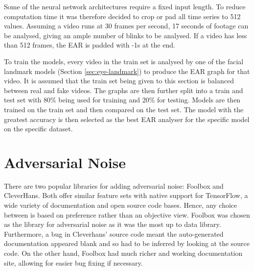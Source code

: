 Some of the neural network architectures require a fixed input length. To reduce computation time it was therefore decided to crop or pad all time series to 512 values. Assuming a video runs at 30 frames per second, 17 seconds of footage can be analysed, giving an ample number of blinks to be analysed. If a video has less than 512 frames, the EAR is padded with -1s at the end.

To train the models, every video in the train set is analysed by one of the facial landmark models (Section \ref{sec:eye-landmark}) to produce the EAR graph for that video. It is assumed that the train set being given to this section is balanced between real and fake videos. The graphs are then further split into a train and test set with 80\% being used for training and 20\% for testing. Models are then trained on the train set and then compared on the test set. The model with the greatest accuracy is then selected as the best EAR analyser for the specific model on the specific dataset.

\section{Adversarial Noise}
\label{sec:ad-noise}


There are two popular libraries for adding adversarial noise: Foolbox\cite{rauber2017foolbox}\cite{rauber2017foolboxnative} and CleverHans\cite{papernot2018cleverhans}. Both offer similar feature sets with native support for TensorFlow, a wide variety of documentation and open source code bases. Hence, any choice between is based on preference rather than an objective view. Foolbox was chosen as the library for adversarial noise as it was the most up to data library. Furthermore, a bug in Cleverhans' source code meant the auto-generated documentation appeared blank and so had to be inferred by looking at the source code. On the other hand, Foolbox had much richer and working documentation site, allowing for easier bug fixing if necessary.

